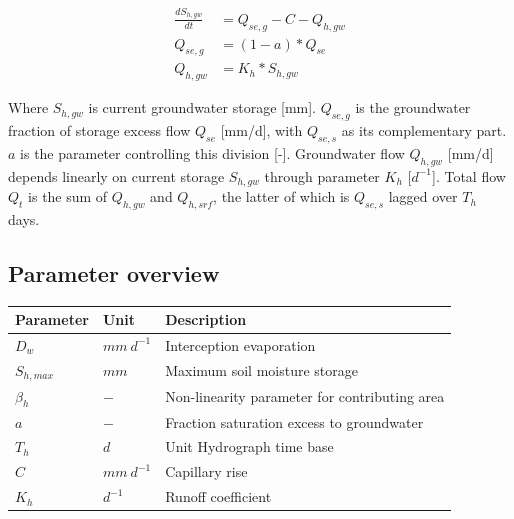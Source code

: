 \begin{align}
	\frac{dS_{h,gw}}{dt} &= Q_{se,g}-C-Q_{h,gw} \\
	Q_{se,g} &= (1-a)*Q_{se}\\
	Q_{h,gw} &= K_h*S_{h,gw}
\end{align}

Where $S_{h,gw}$ is current groundwater storage [mm]. $Q_{se,g}$ is the groundwater fraction of storage excess flow $Q_{se}$ [mm/d], with $Q_{se,s}$ as its complementary part. $a$ is the parameter controlling this division [-]. Groundwater flow $Q_{h,gw}$ [mm/d] depends linearly on current storage $S_{h,gw}$ through parameter $K_h$ [$d^{-1}$]. Total flow $Q_t$ is the sum of $Q_{h,gw}$ and $Q_{h,srf}$, the latter of which is $Q_{se,s}$ lagged over $T_h$ days.

\subsection{Parameter overview}
\begin{table}[htbp]
  \centering
    \begin{tabular}{lll}
    \toprule
    Parameter & Unit  & Description \\
    \midrule
    $D_w$ & $mm~d^{-1}$ & Interception evaporation  \\
    $S_{h,max}$ & $mm$  & Maximum soil moisture storage \\
    $\beta_h$ & $-$   & Non-linearity parameter for contributing area \\
    $a$   & $-$   & Fraction saturation excess to groundwater \\
    $T_h$ & $d$   & Unit Hydrograph time base \\
    $C$   & $mm~d^{-1}$ & Capillary rise \\
    $K_h$ & $d^{-1}$ & Runoff coefficient \\
    \bottomrule
    \end{tabular}%
  \label{tab:addlabel}%
\end{table}%

